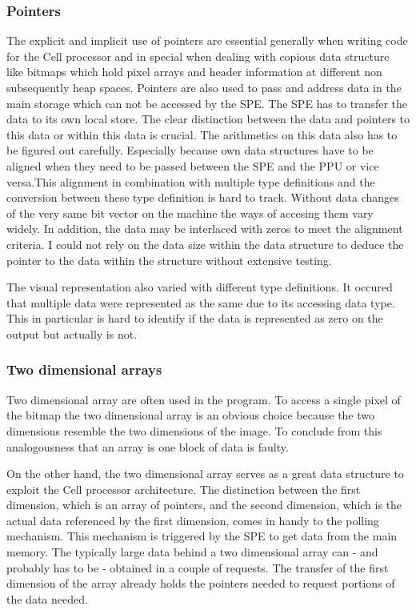 \subsubsection{Pointers}
The explicit and implicit use of pointers are essential generally when writing code for the Cell processor and in special when dealing with copious data structure like bitmaps which hold pixel arrays and header information at different non subsequently heap spaces. Pointers are also used to pass and address data in the main storage which can not be accessed by the SPE. The SPE has to transfer the data to its own local store. The clear distinction between the data and pointers to this data or within this data is crucial. The arithmetics on this data also has to be figured out carefully. Especially because own data structures have to be aligned when they need to be passed between the SPE and the PPU or vice versa.This alignment in combination with multiple type definitions and the conversion between these type definition is hard to track. Without data changes of the very same bit vector on the machine the ways of accesing them vary widely. In addition, the data may be interlaced with zeros to meet the alignment criteria. I could not rely on the data size within the data structure to deduce the pointer to the data within the structure without extensive testing.

The visual representation also varied with different type definitions. It occured that multiple data were represented as the same due to its accessing data type. This in particular is hard to identify if the data is represented as zero on the output but actually is not.

\subsubsection{Two dimensional arrays}
\label{sec:2darray}
Two dimensional array are often used in the program. To access a single pixel of the bitmap the two dimensional array is an obvious choice because the two dimensions resemble the two dimensions of the image. To conclude from this analogousness that an array is one block of data is faulty.

On the other hand, the two dimensional array serves as a great data structure to exploit the Cell processor architecture. The distinction between the first dimension, which is an array of pointers, and the second dimension, which is the actual data referenced by the first dimension, comes in handy to the polling mechanism. This mechanism is triggered by the SPE to get data from the main memory. The typically large data behind a two dimensional array can - and probably has to be - obtained in a couple of requests. The transfer of the first dimension of the array already holds the pointers needed to request portions of the data needed.

